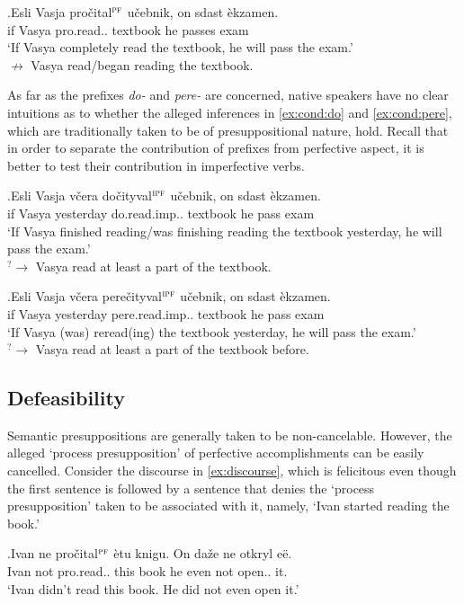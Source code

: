 \exg.\label{ex:cond}Esli Vasja pro\v{c}ital$^{\textsc{pf}}$ u\v{c}ebnik, on sdast \`{e}kzamen.\\
if Vasya pro.read.. textbook he passes exam\\
\trans `If Vasya completely read the textbook, he will pass the exam.'\\
$\nrightarrow$ Vasya read/began reading the textbook.

As far as the prefixes \textit{do-} and \textit{pere-} are concerned, native speakers have no clear intuitions as to whether the alleged inferences in \ref{ex:cond:do} and \ref{ex:cond:pere}, which are traditionally taken to be of presuppositional nature, hold. Recall that in order to separate the contribution of prefixes from perfective aspect, it is better to test their contribution in imperfective verbs.

\exg.\label{ex:cond:do}Esli Vasja v\v{c}era do\v{c}ityval$^{\textsc{ipf}}$ u\v{c}ebnik, on sdast \`{e}kzamen.\\
if Vasya yesterday do.read.imp.. textbook he pass exam\\
\trans `If Vasya finished reading/was finishing reading the textbook yesterday, he will pass the exam.'\\
$^?\rightarrow$ Vasya read at least a part of the textbook.

\exg.\label{ex:cond:pere}Esli Vasja v\v{c}era pere\v{c}ityval$^{\textsc{ipf}}$ u\v{c}ebnik, on sdast \`{e}kzamen.\\
if Vasya yesterday pere.read.imp.. textbook he pass exam\\
\trans `If Vasya (was) reread(ing) the textbook yesterday, he will pass the exam.'\\
$^?\rightarrow$ Vasya read at least a part of the textbook before.


\subsection{Defeasibility}
Semantic presuppositions are generally taken to be non-cancelable. However, the alleged `process presupposition' of perfective accomplishments can be easily cancelled. Consider the discourse in \ref{ex:discourse}, which is felicitous even though the first sentence is followed by a sentence that denies the `process presupposition' taken to be associated with it, namely, `Ivan started reading the book.'

\exg.\label{ex:discourse}Ivan ne pro\v{c}ital$^{\textsc{pf}}$ \`{e}tu knigu. On da\v{z}e ne otkryl e\"{e}.\\
Ivan not pro.read.. this book he even not open.. it.\\
\trans `Ivan didn't read this book. He did not even open it.'

